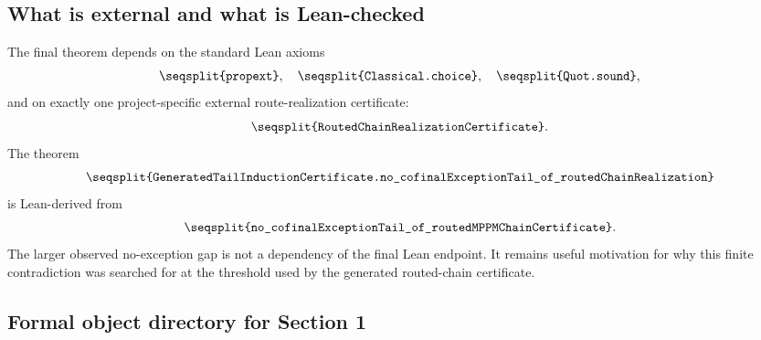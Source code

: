 \documentclass[11pt]{article}
\newcommand{\Lean}[1]{\texttt{\seqsplit{#1}}}
\begin{document}
\subsection{What is external and what is Lean-checked}

The final theorem depends on the standard Lean axioms
\[
  \Lean{propext},\quad \Lean{Classical.choice},\quad \Lean{Quot.sound},
\]
and on exactly one project-specific external route-realization certificate:
\[
  \Lean{RoutedChainRealizationCertificate}.
\]
The theorem
\[
  \Lean{GeneratedTailInductionCertificate.no\_cofinalExceptionTail\_of\_routedChainRealization}
\]
is Lean-derived from
\[
  \Lean{no\_cofinalExceptionTail\_of\_routedMPPMChainCertificate}.
\]
The larger observed no-exception gap is not a dependency of the final Lean
endpoint.  It remains useful motivation for why this finite contradiction was
searched for at the threshold used by the generated routed-chain certificate.

\subsection{Formal object directory for Section 1}
\end{document}
